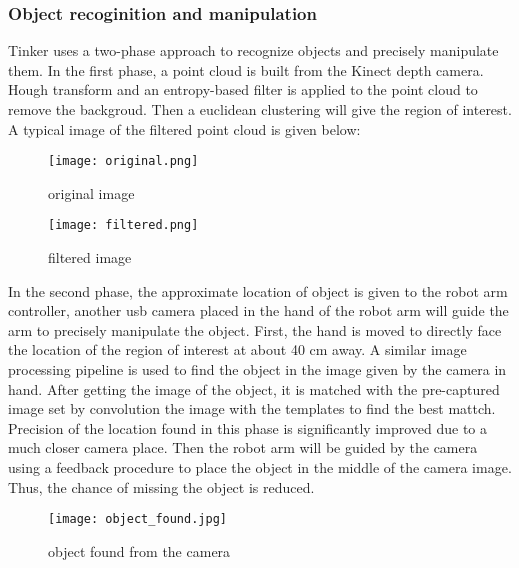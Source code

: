 \subsubsection{Object recoginition and manipulation}
Tinker uses a two-phase approach to recognize objects and precisely manipulate them. In the first phase, a point cloud is built from the Kinect depth camera. Hough transform and an entropy-based filter is applied to the point cloud to remove the backgroud. Then a euclidean clustering will give the region of interest. A typical image of the filtered point cloud is given below:
\begin{figure}[H]
    \texttt{[image: original.png]}
    \caption{original image}
\end{figure}

\begin{figure}[H]
    \texttt{[image: filtered.png]}
    \caption{filtered image}
\end{figure}

In the second phase, the approximate location of object is given to the robot arm controller, another usb camera placed in the hand of the robot arm will guide the arm to precisely manipulate the object. First, the hand is moved to directly face the location of the region of interest at about 40 cm away. A similar image processing pipeline is used to find the object in the image given by the camera in hand. After getting the image of the object, it is matched with the pre-captured image set by convolution the image with the templates to find the best mattch. Precision of the location found in this phase is significantly improved due to a much closer camera place. Then the robot arm will be guided by the camera using a feedback procedure to place the object in the middle of the camera image. Thus, the chance of missing the object is reduced.

\begin{figure}[H]
    \texttt{[image: object\_found.jpg]}
    \caption{object found from the camera}
\end{figure}
